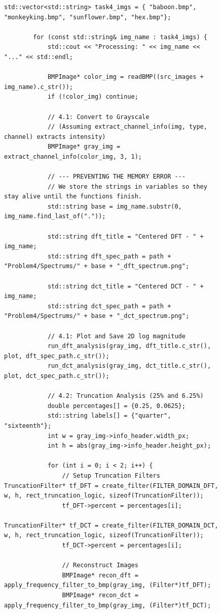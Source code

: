 \documentclass[11pt]{article}
\begin{document}
\begin{figure}[H]
\begin{verbatim}
std::vector<std::string> task4_imgs = { "baboon.bmp", "monkeyking.bmp", "sunflower.bmp", "hex.bmp"};

        for (const std::string& img_name : task4_imgs) {
            std::cout << "Processing: " << img_name << "..." << std::endl;

            BMPImage* color_img = readBMP((src_images + img_name).c_str());
            if (!color_img) continue;

            // 4.1: Convert to Grayscale
            // (Assuming extract_channel_info(img, type, channel) extracts intensity)
            BMPImage* gray_img = extract_channel_info(color_img, 3, 1);

            // --- PREVENTING THE MEMORY ERROR ---
            // We store the strings in variables so they stay alive until the functions finish.
            std::string base = img_name.substr(0, img_name.find_last_of("."));

            std::string dft_title = "Centered DFT - " + img_name;
            std::string dft_spec_path = path + "Problem4/Spectrums/" + base + "_dft_spectrum.png";

            std::string dct_title = "Centered DCT - " + img_name;
            std::string dct_spec_path = path + "Problem4/Spectrums/" + base + "_dct_spectrum.png";

            // 4.1: Plot and Save 2D log magnitude
            run_dft_analysis(gray_img, dft_title.c_str(), plot, dft_spec_path.c_str());
            run_dct_analysis(gray_img, dct_title.c_str(), plot, dct_spec_path.c_str());

            // 4.2: Truncation Analysis (25% and 6.25%)
            double percentages[] = {0.25, 0.0625};
            std::string labels[] = {"quarter", "sixteenth"};
            int w = gray_img->info_header.width_px;
            int h = abs(gray_img->info_header.height_px);

            for (int i = 0; i < 2; i++) {
                // Setup Truncation Filters
TruncationFilter* tf_DFT = create_filter(FILTER_DOMAIN_DFT, w, h, rect_truncation_logic, sizeof(TruncationFilter));
                tf_DFT->percent = percentages[i];

TruncationFilter* tf_DCT = create_filter(FILTER_DOMAIN_DCT, w, h, rect_truncation_logic, sizeof(TruncationFilter));
                tf_DCT->percent = percentages[i];

                // Reconstruct Images
                BMPImage* recon_dft = apply_frequency_filter_to_bmp(gray_img, (Filter*)tf_DFT);
                BMPImage* recon_dct = apply_frequency_filter_to_bmp(gray_img, (Filter*)tf_DCT);


\end{verbatim}
\end{figure}
\end{document}
